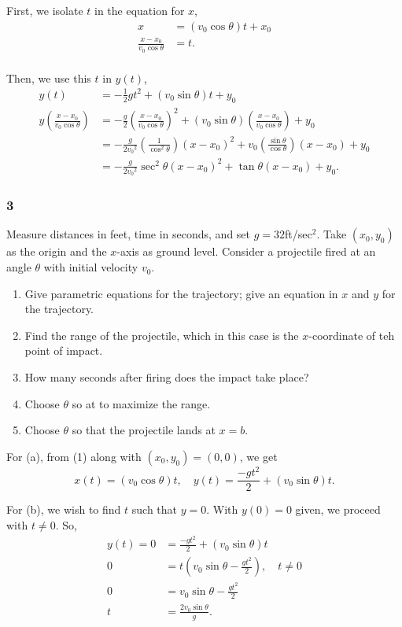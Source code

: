 \documentclass[../hw10]{subfiles}
\begin{document}
First, we isolate $t$ in the equation for $x$,
\begin{align*}
    x&=(v_0\cos{\theta})t+x_0 \\
    \frac{x-x_0}{v_0\cos{\theta}}&=t. \\
\end{align*}

Then, we use this $t$ in $y(t)$,
\begin{align*}
    y(t) &= -\frac{1}{2}gt^2+(v_0\sin{\theta})t+y_0 \\
    y\left( \frac{x-x_0}{v_0\cos{\theta}} \right) &= -\frac{g}{2}{\left( \frac{x-x_0}{v_0\cos{\theta}} \right)}^2 + (v_0\sin{\theta})\left( \frac{x-x_0}{v_0\cos{\theta}} \right)+y_0 \\
    &= -\frac{g}{2{v_0}^2}\left( \frac{1}{\cos^2{\theta}}\right){(x-x_0)}^2 +v_0\left( \frac{\sin{\theta}}{\cos{\theta}}\right) (x-x_0) + y_0 \\
    &= -\frac{g}{2{v_0}^2}\sec^2{\theta}{(x-x_0)}^2+\tan{\theta}(x-x_0)+y_0.
\end{align*}

\subsubsection*{3}
Measure distances in feet, time in seconds, and set $g=32$ft/sec$^2$. 
Take $(x_0,y_0)$ as the origin and the $x$-axis as ground level.
Consider a projectile fired at an angle $\theta$ with initial velocity $v_0$.

\begin{enumerate}[label=\alph*.]
    \item Give parametric equations for the trajectory; give an equation in $x$ and $y$ for the trajectory.
    \item Find the range of the projectile, which in this case is the $x$-coordinate of teh point of impact.
    \item How many seconds after firing does the impact take place?
    \item Choose $\theta$ so at to maximize the range.
    \item Choose $\theta$ so that the projectile lands at $x=b$.
\end{enumerate}

For (a), from (1) along with $(x_0,y_0)=(0,0)$, we get
\[x(t)=(v_0\cos{\theta})t, \quad y(t)=\frac{-gt^2}{2}+(v_0\sin{\theta})t.\]

For (b), we wish to find $t$ such that $y=0$. With $y(0)=0$ given, we proceed with $t\neq0$. So,
\begin{align*}
    y(t)=0&=\frac{-gt^2}{2}+(v_0\sin{\theta})t \\
    0 &= t(v_0\sin{\theta}-\frac{gt^2}{2}), \quad t\neq0 \\
    0 &= v_0\sin{\theta} - \frac{gt^2}{2} \\
    t &= \frac{2v_0\sin{\theta}}{g}. \\
\end{align*}
\end{document}
